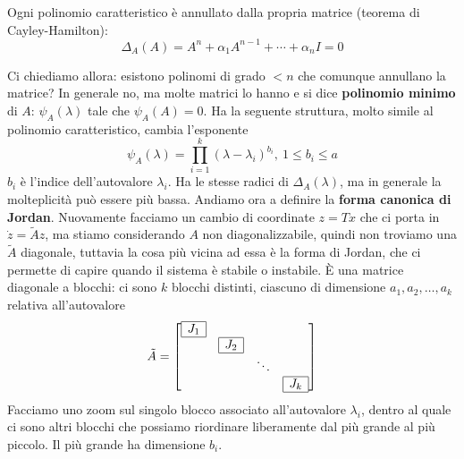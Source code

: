 \documentclass[10pt,a4paper]{book}
\begin{document}
\begin{ricalg}
Ogni polinomio caratteristico è annullato dalla propria matrice (teorema di Cayley-Hamilton):\begin{equation*}
\Delta _{A}\left( A\right) =A^{n} +\alpha _{1} A^{n-1} +\cdots +\alpha _{n} I=0
\end{equation*}
\end{ricalg}
Ci chiediamo allora: esistono polinomi di grado $< n$ che comunque annullano la matrice? In generale no, ma molte matrici lo hanno e si dice \textbf{polinomio minimo} di $A$: $\psi _{A}\left( \lambda \right)$ tale che $\psi _{A}\left( A\right) =0$. Ha la seguente struttura, molto simile al polinomio caratteristico, cambia l'esponente
\begin{equation}
\psi _{A}\left( \lambda \right) =\prod ^{k}_{i=1}\left( \lambda -\lambda _{i}\right)^{b_{i}} ,\ 1\leqslant b_{i} \leqslant a
\end{equation}
$b_{i}$ è l'indice dell'autovalore $\lambda _{i}$. Ha le stesse radici di $\Delta _{A}\left( \lambda \right)$, ma in generale la molteplicità può essere più bassa. Andiamo ora a definire la \textbf{forma canonica di Jordan}. Nuovamente facciamo un cambio di coordinate $z=Tx$ che ci porta in $\dot{z} =\tilde{A} z$, ma stiamo considerando $A$ non diagonalizzabile, quindi non troviamo una $\tilde{A}$ diagonale, tuttavia la cosa più vicina ad essa è la forma di Jordan, che ci permette di capire quando il sistema è stabile o instabile. È una matrice diagonale a blocchi: ci sono $k$ blocchi distinti, ciascuno di dimensione $a_{1} ,a_{2} ,\dotsc ,a_{k}$ relativa all'autovalore
\begin{equation*}
\tilde{A} =\begin{bmatrix}
\begin{array}{|c|}
\hline
J_{1}\\
\hline
\end{array} &  &  & \\
 & \begin{array}{|c|}
\hline
J_{2}\\
\hline
\end{array} &  & \\
 &  & \ddots  & \\
 &  &  & \begin{array}{|c|}
\hline
J_{k}\\
\hline
\end{array}
\end{bmatrix}
\end{equation*}
Facciamo uno zoom sul singolo blocco associato all'autovalore $\lambda _{i}$, dentro al quale ci sono altri blocchi che possiamo riordinare liberamente dal più grande al più piccolo. Il più grande ha dimensione $b_{i}$.
\end{document}
